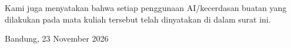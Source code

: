 \noindent Kami juga menyatakan bahwa setiap penggunaan AI/kecerdasan buatan yang
dilakukan pada mata kuliah tersebut telah dinyatakan di dalam surat ini.

\bigskip
\begin{flushright}
	Bandung, 23 November 2026
\end{flushright}

\bigskip
\noindent
\begin{center}
	\hspace{1cm}%

	\vspace{0.8cm}
	\hspace{1cm}%

	\vspace{0.8cm}
\end{center}
